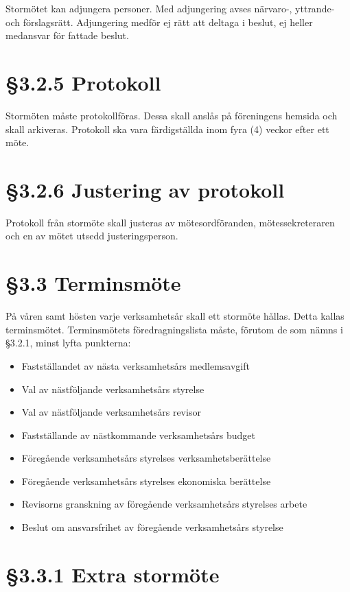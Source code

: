 \documentclass[]{article}
\providecommand{\tightlist}{%
  \setlength{\itemsep}{0pt}\setlength{\parskip}{0pt}}
\begin{document}
Stormötet kan adjungera personer. Med adjungering avses närvaro-,
yttrande- och förslagsrätt. Adjungering medför ej rätt att deltaga i
beslut, ej heller medansvar för fattade beslut.

\section{§3.2.5 Protokoll}\label{protokoll}

Stormöten måste protokollföras. Dessa skall anslås på föreningens
hemsida och skall arkiveras. Protokoll ska vara färdigställda inom fyra
(4) veckor efter ett möte.

\section{§3.2.6 Justering av protokoll}\label{justering-av-protokoll}

Protokoll från stormöte skall justeras av mötesordföranden,
mötessekreteraren och en av mötet utsedd justeringsperson.

\section{§3.3 Terminsmöte}\label{terminsmuxf6te}

På våren samt hösten varje verksamhetsår skall ett stormöte hållas.
Detta kallas terminsmötet. Terminsmötets föredragningslista måste,
förutom de som nämns i §3.2.1, minst lyfta punkterna:

\begin{itemize}
\tightlist
\item
  Fastställandet av nästa verksamhetsårs medlemsavgift
\item
  Val av nästföljande verksamhetsårs styrelse
\item
  Val av nästföljande verksamhetsårs revisor
\item
  Fastställande av nästkommande verksamhetsårs budget
\item
  Föregående verksamhetsårs styrelses verksamhetsberättelse
\item
  Föregående verksamhetsårs styrelses ekonomiska berättelse
\item
  Revisorns granskning av föregående verksamhetsårs styrelses arbete
\item
  Beslut om ansvarsfrihet av föregående verksamhetsårs styrelse
\end{itemize}

\section{§3.3.1 Extra stormöte}\label{extra-stormuxf6te}
\end{document}
